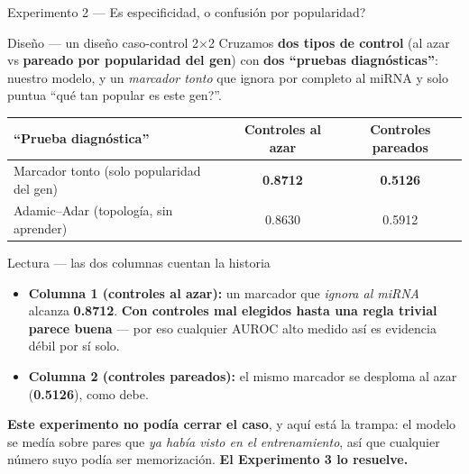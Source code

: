 
\begin{frame}{Experimento 2 --- \textquestiondown{}Es especificidad, o confusi\'on por popularidad?}
  \begin{block}{Dise\~no --- un dise\~no caso-control 2$\times$2}
    \scriptsize
    Cruzamos \textbf{dos tipos de control} (al azar vs \textbf{pareado por popularidad del gen}) con \textbf{dos ``pruebas diagn\'osticas''}: nuestro modelo, y un \emph{marcador tonto} que ignora por completo al miRNA y solo puntua ``\textquestiondown{}qu\'e tan popular es este gen?''.
  \end{block}

  \vspace{0.3em}
  \centering
  \small
  \begin{tabular}{lcc}
    \toprule
    \textbf{``Prueba diagn\'ostica''} & \textbf{Controles al azar} & \textbf{Controles pareados} \\
    \midrule
    Marcador tonto (solo popularidad del gen) & \textbf{0.8712} & \textbf{0.5126} \\
    Adamic--Adar (topolog\'ia, sin aprender) & 0.8630 & 0.5912 \\
    \bottomrule
  \end{tabular}

  \vspace{0.4em}
  \raggedright
  \begin{block}{Lectura --- las dos columnas cuentan la historia}
    \scriptsize
    \begin{itemize}
      \item \textbf{Columna 1 (controles al azar):} un marcador que \emph{ignora al miRNA}
            alcanza \textbf{0.8712}. \textbf{Con controles mal elegidos hasta una regla
            trivial parece buena} --- por eso cualquier AUROC alto medido as\'i es
            evidencia d\'ebil por s\'i solo.
      \item \textbf{Columna 2 (controles pareados):} el mismo marcador se desploma al azar
            (\textbf{0.5126}), como debe.
    \end{itemize}
    \vspace{0.2em}
    \textbf{Este experimento no pod\'ia cerrar el caso}, y aqu\'i est\'a la trampa: el
    modelo se med\'ia sobre pares que \emph{ya hab\'ia visto en el entrenamiento}, as\'i
    que cualquier n\'umero suyo pod\'ia ser memorizaci\'on. \textbf{El Experimento 3 lo
    resuelve.}
  \end{block}


\end{frame}
